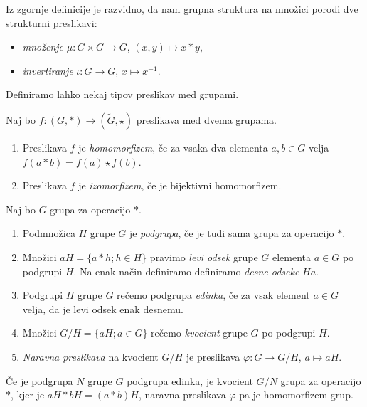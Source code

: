\documentclass[mat1]{fmfdelo}
\begin{document}
Iz zgornje definicije je razvidno, da nam grupna struktura na množici porodi dve strukturni preslikavi:
\begin{itemize}
\item \emph{množenje} $\mu: G \times G \to G$, $(x, y) \mapsto x*y$,
\item \emph{invertiranje} $\iota: G \to G$, $x \mapsto x^{-1}$.
\end{itemize}

Definiramo lahko nekaj tipov preslikav med grupami.

\begin{definicija}\label{def:algpreslikave}
Naj bo $f: (G, *) \to (\widetilde{G}, \star)$ preslikava med dvema grupama.
\begin{enumerate}
\item Preslikava $f$ je \emph{homomorfizem}, če za vsaka dva elementa $a, b \in G$ velja $f(a*b) = f(a) \star f(b)$.
\item Preslikava $f$ je \emph{izomorfizem}, če je bijektivni homomorfizem.
\end{enumerate}
\end{definicija}

\begin{definicija}\label{def:podgrupa}
Naj bo $G$ grupa za operacijo $*$.
\begin{enumerate}
\item Podmnožica $H$ grupe $G$ je \emph{podgrupa}, če je tudi sama grupa za operacijo $*$.
\item Množici $aH = \lbrace a*h ; h \in H \rbrace$ pravimo \emph{levi odsek} grupe $G$ elementa $a \in G$ po podgrupi $H$. Na enak način definiramo definiramo \emph{desne odseke} $Ha$.
\item Podgrupi $H$ grupe $G$ rečemo podgrupa \emph{edinka}, če za vsak element $a \in G$ velja, da je levi odsek enak desnemu.
\item Množici $G/H = \lbrace aH ; a \in G \rbrace$ rečemo \emph{kvocient} grupe $G$ po podgrupi $H$.
\item \emph{Naravna preslikava} na kvocient $G/H$ je preslikava $\varphi: G \to G/H$, $a \mapsto aH$.
\end{enumerate}
\end{definicija}

\begin{trditev}
Če je podgrupa $N$ grupe $G$ podgrupa edinka, je kvocient $G/N$ grupa za operacijo $*$, kjer je $aH*bH = (a*b)H$, naravna preslikava $\varphi$ pa je homomorfizem grup.
\end{trditev}
\end{document}

